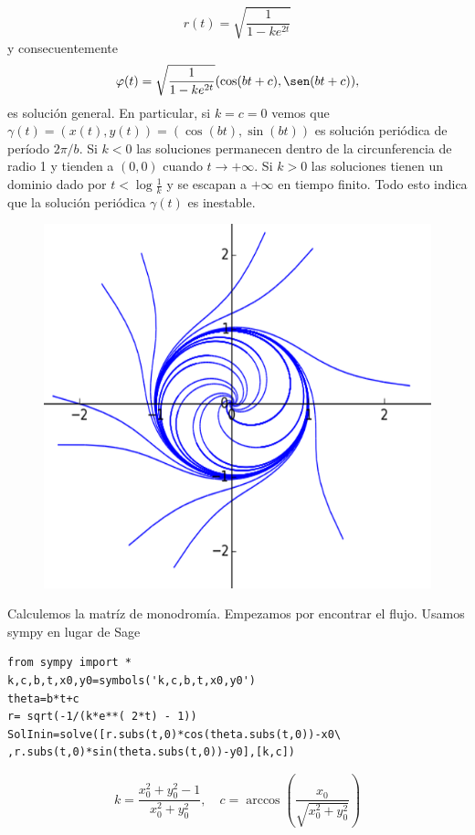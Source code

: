 \begin{ejemplo}
\[
 r(t)=\sqrt{\frac{1}{1-ke^{2t}}}
\]
y consecuentemente
\begin{equation}\label{eq:flujo_ejemplo6.5}
 \varphi(t)=\sqrt{\frac{1}{1-ke^{2t}}}(\cos(bt+c),\sen(bt+c)),
\end{equation}
es solución general. 
En particular, si $k=c=0$ vemos que   $\gamma(t)=(x(t),y(t))=(\cos(bt),\sin(bt))$ es solución periódica de período $2\pi/b$. Si $k<0$ las soluciones  permanecen dentro de la circunferencia  de radio 1 y tienden a $(0,0)$ cuando $t\to+\infty$. Si $k>0$   las soluciones tienen un dominio dado por  $t<\log\frac{1}{k}$ y se escapan a $+\infty$ en tiempo finito. Todo esto indica que la solución periódica   $\gamma(t)$ es inestable. 
\begin{figure}
 \includegraphics[scale=.4]{imagenes/sol_rotadas.png}
\end{figure}
Calculemos la matríz de monodromía. Empezamos por encontrar el flujo. Usamos sympy en lugar de Sage
\begin{lstlisting}
from sympy import *
k,c,b,t,x0,y0=symbols('k,c,b,t,x0,y0')
theta=b*t+c
r= sqrt(-1/(k*e**( 2*t) - 1))
SolInin=solve([r.subs(t,0)*cos(theta.subs(t,0))-x0\
,r.subs(t,0)*sin(theta.subs(t,0))-y0],[k,c])
\end{lstlisting}

\begin{equation}\label{eq:para_ejemplo6.5}
k=\frac{x_{0}^{2} + y_{0}^{2} - 1}{x_{0}^{2} + y_{0}^{2}}, \quad c=\operatorname{arccos}{\left (\frac{x_{0}}{\sqrt{x_{0}^{2} + y_{0}^{2}}} \right )} 
\end{equation}





\end{ejemplo}

